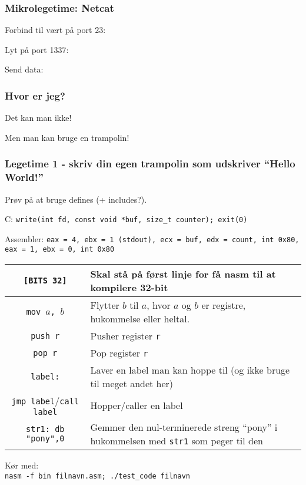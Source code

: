 \documentclass[slidestop,compress,mathserif, xcolor=table]{beamer}
\begin{document}
\begin{frame}[c]
    \frametitle{Mikrolegetime: Netcat}

    \lstset{language=bash, numbers=none}
    \pause
    Forbind til vært på port 23:
    
    \pause
    Lyt på port 1337:
    
    \pause
    Send data:
    
\end{frame}

\begin{frame}[c]
    \frametitle{Hvor er jeg?}

    \pause

    \pause Det kan man ikke! \vskip8pt

    \pause Men man kan bruge en trampolin!

    \pause

\end{frame}

\begin{frame}[c]
    \frametitle{Legetime 1 - skriv din egen trampolin som udskriver ``Hello
    World!''}

  \pause

    {\scriptsize
      Prøv på at bruge defines (+ includes?). \vskip8pt

      C: \texttt{write(int fd, const void *buf, size\_t counter);
        exit(0)} \vskip8pt

      Assembler: \texttt{eax = 4, ebx = 1 (stdout), ecx = buf, edx =
        count, int 0x80, eax = 1, ebx = 0, int 0x80} \vskip8pt

      \begin{tabular}{|c|p{6cm}|}
        \hline
        \texttt{[BITS 32]} & Skal stå på først linje for få nasm til at kompilere 32-bit \\\hline
        \texttt{mov $a$, $b$} & Flytter $b$ til $a$, hvor $a$ og $b$ er registre,
        hukommelse eller heltal. \\\hline
        \texttt{push r} & Pusher register \texttt{r} \\\hline
        \texttt{pop r} & Pop register \texttt{r} \\\hline
        \texttt{label:} & Laver en label man kan hoppe til (og ikke bruge til meget
        andet her) \\\hline
        \texttt{jmp label}/\texttt{call label} & Hopper/caller en label \\\hline
        \texttt{str1: db "pony",0} & Gemmer den nul-terminerede streng ``pony'' i hukommelsen med \texttt{str1} som peger til den \\\hline
      \end{tabular} \vskip8pt

      Kør med: \\\texttt{nasm -f bin filnavn.asm; ./test\_code filnavn}
    }
\end{frame}
\end{document}

